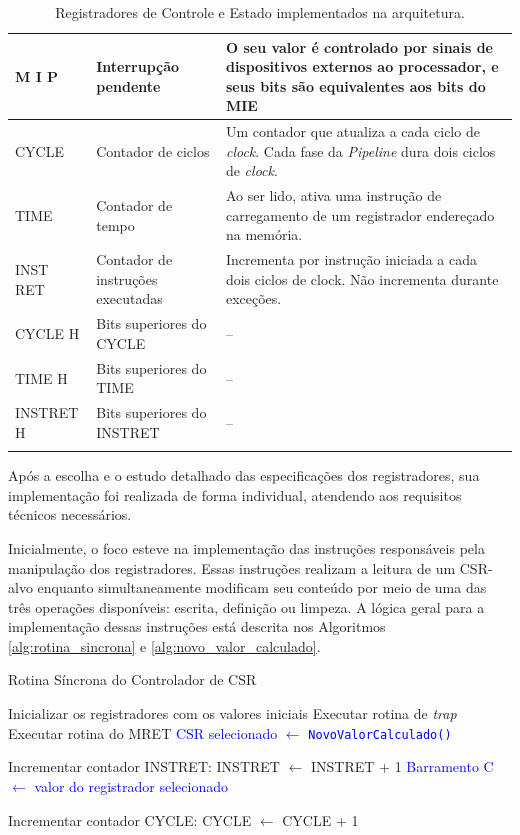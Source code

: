 \documentclass[
	12pt,				%
	openright,			%
	oneside,			%
	a4paper,			%
	english,			%
	french,				%
	spanish,			%
	brazil,				%
	]{abntex2}
\begin{document}
{\begin{longtable}{|p{3cm}|p{5cm}|p{8cm}|}
\hline  
M I P & Interrupção pendente & O seu valor é controlado por sinais de dispositivos externos ao processador, e seus bits são equivalentes aos bits do MIE \\ 
\hline  
CYCLE & Contador de ciclos & Um contador que atualiza a cada ciclo de \textit{clock}. Cada fase da \textit{Pipeline} dura dois ciclos de \textit{clock}. \\ 
\hline  
TIME & Contador de tempo & Ao ser lido, ativa uma instrução de carregamento de um registrador endereçado na memória. \\ 
\hline  
INST RET & Contador de instruções executadas & Incrementa por instrução iniciada a cada dois ciclos de clock. Não incrementa durante exceções. \\ 
\hline  
CYCLE H & Bits superiores do CYCLE & -- \\ 
\hline  
TIME H & Bits superiores do TIME & -- \\ 
\hline  
INSTRET H & Bits superiores do INSTRET & -- \\ \hline  
\captionsetup{width=1\textwidth}
\caption{Registradores de Controle e Estado implementados na arquitetura.}
\label{tab:registers}
\end{longtable}
}
Após a escolha e o estudo detalhado das especificações dos registradores, sua implementação foi realizada de forma individual, atendendo aos requisitos técnicos necessários.

Inicialmente, o foco esteve na implementação das instruções responsáveis pela manipulação dos registradores. Essas instruções realizam a leitura de um CSR-alvo enquanto simultaneamente modificam seu conteúdo por meio de uma das três operações disponíveis: escrita, definição ou limpeza. A lógica geral para a implementação dessas instruções está descrita nos Algoritmos \ref{alg:rotina_sincrona} e \ref{alg:novo_valor_calculado}.

\begin{algorithm}[h!]
\caption{Rotina Síncrona do Controlador de CSR}
\label{alg:rotina_sincrona}
\begin{algorithmic}[1]
        \STATE Inicializar os registradores com os valores iniciais
            \STATE Executar rotina de \textit{trap}
            \STATE Executar rotina do MRET
            \STATE \textcolor{blue}{CSR selecionado $\leftarrow$ \texttt{NovoValorCalculado()}}
        \ENDIF

            \STATE Incrementar contador INSTRET: INSTRET $\leftarrow$ INSTRET + 1
        \ENDIF
        \STATE \textcolor{blue}{Barramento C $\leftarrow$ valor do registrador selecionado}
    \ENDIF

        \STATE Incrementar contador CYCLE: CYCLE $\leftarrow$ CYCLE + 1
    \ENDIF
\end{algorithmic}
\end{algorithm}
\end{document}
